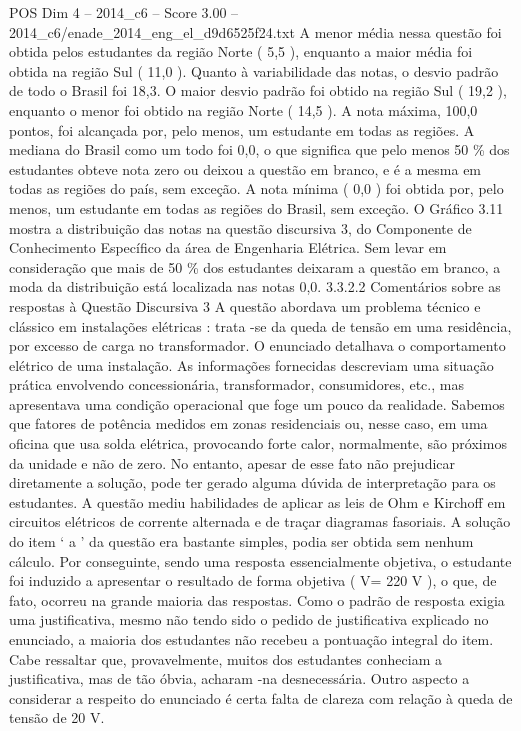 \begin{textsample}{POS Dim 4 – 2014\_c6 – Score 3.00 – 2014\_c6/enade\_2014\_eng\_el\_d9d6525f24.txt}
A menor média nessa questão foi obtida pelos estudantes da região Norte ( 5,5 ), enquanto a maior média foi obtida na região Sul ( 11,0 ).
Quanto à variabilidade das notas, o desvio padrão de todo o Brasil foi 18,3.
O maior desvio padrão foi obtido na região Sul ( 19,2 ), enquanto o menor foi obtido na região Norte ( 14,5 ).
A nota máxima, 100,0 pontos, foi alcançada por, pelo menos, um estudante em todas as regiões.
A mediana do Brasil como um todo foi 0,0, o que significa que pelo menos 50 \% dos estudantes obteve nota zero ou deixou a questão em branco, e é a mesma em todas as regiões do país, sem exceção.
A nota mínima ( 0,0 ) foi obtida por, pelo menos, um estudante em todas as regiões do Brasil, sem exceção.
O Gráfico 3.11 mostra a distribuição das notas na questão discursiva 3, do Componente de Conhecimento Específico da área de Engenharia Elétrica.
Sem levar em consideração que mais de 50 \% dos estudantes deixaram a questão em branco, a moda da distribuição está localizada nas notas 0,0. 3.3.2.2 Comentários sobre as respostas à Questão Discursiva 3 A questão abordava um problema técnico e clássico em instalações elétricas : trata -se da queda de tensão em uma residência, por excesso de carga no transformador.
O enunciado detalhava o comportamento elétrico de uma instalação.
As informações fornecidas descreviam uma situação prática envolvendo concessionária, transformador, consumidores, etc., mas apresentava uma condição operacional que foge um pouco da realidade.
Sabemos que fatores de potência medidos em zonas residenciais ou, nesse caso, em uma oficina que usa solda elétrica, provocando forte calor, normalmente, são próximos da unidade e não de zero.
No entanto, apesar de esse fato não prejudicar diretamente a solução, pode ter gerado alguma dúvida de interpretação para os estudantes.
A questão mediu habilidades de aplicar as leis de Ohm e Kirchoff em circuitos elétricos de corrente alternada e de traçar diagramas fasoriais.
A solução do item ‘ a ’ da questão era bastante simples, podia ser obtida sem nenhum cálculo.
Por conseguinte, sendo uma resposta essencialmente objetiva, o estudante foi induzido a apresentar o resultado de forma objetiva ( V= 220 V ), o que, de fato, ocorreu na grande maioria das respostas.
Como o padrão de resposta exigia uma justificativa, mesmo não tendo sido o pedido de justificativa explicado no enunciado, a maioria dos estudantes não recebeu a pontuação integral do item.
Cabe ressaltar que, provavelmente, muitos dos estudantes conheciam a justificativa, mas de tão óbvia, acharam -na desnecessária.
Outro aspecto a considerar a respeito do enunciado é certa falta de clareza com relação à queda de tensão de 20 V.

\end{textsample}
